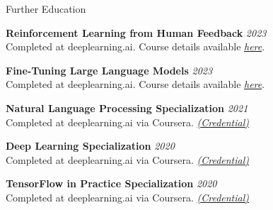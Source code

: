 \documentclass[
	11pt, %
]{./../assets/resume} %
\begin{document}
\begin{rSection}{Further Education}

\textbf{Reinforcement Learning from Human Feedback} \textit{\hfill{2023}}\\
Completed at deeplearning.ai. Course details available \href{https://www.deeplearning.ai/short-courses/reinforcement-learning-from-human-feedback/}{{\textit{here}}}.

\textbf{Fine-Tuning Large Language Models} \textit{\hfill{2023}}\\
Completed at deeplearning.ai. Course details available \href{https://www.deeplearning.ai/short-courses/finetuning-large-language-models/}{{\textit{here}}}.

\textbf{Natural Language Processing Specialization} \textit{\hfill{2021}}\\
Completed at deeplearning.ai via Coursera. \href{https://www.coursera.org/account/accomplishments/specialization/7SLFW68RURSM}{{\textit{(Credential)}}}

\textbf{Deep Learning Specialization} \textit{\hfill{2020}}\\
Completed at deeplearning.ai via Coursera. \href{https://www.coursera.org/account/accomplishments/specialization/MPFQGA5XW7YA}{{\textit{(Credential)}}}

\textbf{TensorFlow in Practice Specialization} \textit{\hfill{2020}}\\
Completed at deeplearning.ai via Coursera. \href{https://www.coursera.org/account/accomplishments/specialization/ZBXQR5GS6HGZ}{{\textit{(Credential)}}}

\end{rSection}







\end{document}
